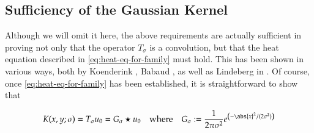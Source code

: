     \subsection{Sufficiency of the Gaussian Kernel}
    
    Although we will omit it here, the above requirements are actually sufficient in proving not only that the operator $T_\sigma$ is a convolution, but that the heat equation described in \cref{eq:heat-eq-for-family} must hold. This has been shown in various ways, both by Koenderink \cite{Koenderink}, Babaud \cite{babaud}, as well as Lindeberg in \cite{GSST-book}. Of course, once \cref{eq:heat-eq-for-family} has been established, it is straightforward to show that
    
    \begin{equation}
       K(x,y;\sigma) = T_{\sigma} u_0 = G_\sigma \star u_0
       	\quad \textrm{where}\quad
       	G_\sigma := \frac{1}{2\pi \sigma^2} e^{\left(-\abs{x}^2 / (2\sigma^2)\right)}
        \end{equation}
    
